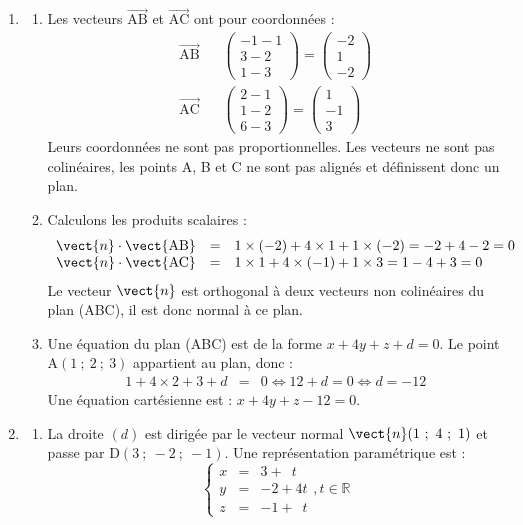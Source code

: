 \begin{enumerate}
\item 
	\begin{enumerate}
		\item Les vecteurs $\overrightarrow{\text{AB}}$ et $\overrightarrow{\text{AC}}$ ont pour coordonnées :
\[
\begin{array}{rcl}
\overrightarrow{\text{AB}} && \begin{pmatrix} -1 - 1 \\ 3 - 2 \\ 1 - 3 \end{pmatrix} = \begin{pmatrix} -2 \\ 1 \\ -2 \end{pmatrix} \\
\overrightarrow{\text{AC}} && \begin{pmatrix} 2 - 1 \\ 1 - 2 \\ 6 - 3 \end{pmatrix} = \begin{pmatrix} 1 \\ -1 \\ 3 \end{pmatrix}
\end{array}
\]
Leurs coordonnées ne sont pas proportionnelles. Les vecteurs ne sont pas colinéaires, les points A, B et C ne sont pas alignés et définissent donc un plan.

		\item Calculons les produits scalaires :
\[
\begin{array}{rcl}
\vect{n} \cdot \vect{\text{AB}} &=& 1 \times (-2) + 4 \times 1 + 1 \times (-2) = -2 + 4 - 2 = 0 \\
\vect{n} \cdot \vect{\text{AC}} &=& 1 \times 1 + 4 \times (-1) + 1 \times 3 = 1 - 4 + 3 = 0
\end{array}
\]
Le vecteur $\vect{n}$ est orthogonal à deux vecteurs non colinéaires du plan (ABC), il est donc normal à ce plan.

\item Une équation du plan (ABC) est de la forme $x + 4 y + z + d = 0$. Le point A$(1~;~2~;~3)$ appartient au plan, donc :
\[
\begin{array}{rcl}
1 + 4\times 2+ 3 + d &=& 0 \iff 12 + d = 0 \iff d = -12
\end{array}
\]
Une équation cartésienne est : $x + 4y + z - 12 = 0$.
\end{enumerate}
\item 
\begin{enumerate}
\item La droite $(d)$ est dirigée par le vecteur normal $\vect{n}(1~;~4~;~1)$ et passe par D$(3~;~-2~;~-1)$. Une représentation paramétrique est :
\[
\left\{
\begin{array}{rcr}
x &=& 3 + \phantom{4}t \\
y &=& -2 + 4t \\
z &=& -1 + \phantom{4}t
\end{array}
\right. , t \in \mathbb{R}
\]


\end{enumerate}
\end{enumerate}
